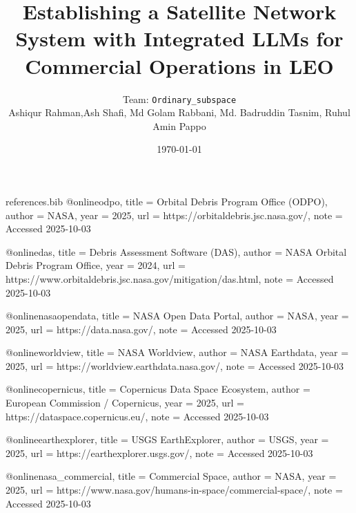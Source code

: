 \begin{filecontents}{references.bib}
@online{odpo,
  title = {Orbital Debris Program Office (ODPO)},
  author = {{NASA}},
  year = {2025},
  url = {https://orbitaldebris.jsc.nasa.gov/},
  note = {Accessed 2025-10-03}
}

@online{das,
  title = {Debris Assessment Software (DAS)},
  author = {{NASA Orbital Debris Program Office}},
  year = {2024},
  url = {https://www.orbitaldebris.jsc.nasa.gov/mitigation/das.html},
  note = {Accessed 2025-10-03}
}

@online{nasaopendata,
  title = {NASA Open Data Portal},
  author = {{NASA}},
  year = {2025},
  url = {https://data.nasa.gov/},
  note = {Accessed 2025-10-03}
}

@online{worldview,
  title = {NASA Worldview},
  author = {{NASA Earthdata}},
  year = {2025},
  url = {https://worldview.earthdata.nasa.gov/},
  note = {Accessed 2025-10-03}
}

@online{copernicus,
  title = {Copernicus Data Space Ecosystem},
  author = {{European Commission / Copernicus}},
  year = {2025},
  url = {https://dataspace.copernicus.eu/},
  note = {Accessed 2025-10-03}
}

@online{earthexplorer,
  title = {USGS EarthExplorer},
  author = {{USGS}},
  year = {2025},
  url = {https://earthexplorer.usgs.gov/},
  note = {Accessed 2025-10-03}
}

@online{nasa_commercial,
  title = {Commercial Space},
  author = {{NASA}},
  year = {2025},
  url = {https://www.nasa.gov/humans-in-space/commercial-space/},
  note = {Accessed 2025-10-03}
}
\end{filecontents}

\documentclass[11pt,a4paper]{article}
\usepackage[utf8]{inputenc}
\usepackage{microtype}
\usepackage{hyperref}
\usepackage{graphicx}
\usepackage{booktabs}
\usepackage{geometry}
\usepackage{enumitem}
\usepackage{caption}
\usepackage{float}
\usepackage{amsmath}
\usepackage{siunitx}
\usepackage{tabularx}
\usepackage{multirow}
\usepackage{csquotes}
\usepackage[backend=biber,style=authoryear,maxbibnames=10]{biblatex}

\geometry{margin=1in}

\title{\LARGE \bfseries Establishing a Satellite Network System with Integrated LLMs for Commercial Operations in LEO}
\author{\LARGE Team: \texttt{Ordinary\_subspace} \\ Ashiqur Rahman,Ash Shafi, Md Golam Rabbani, Md. Badruddin Tasnim, Ruhul Amin Pappo}
\date{\today}



